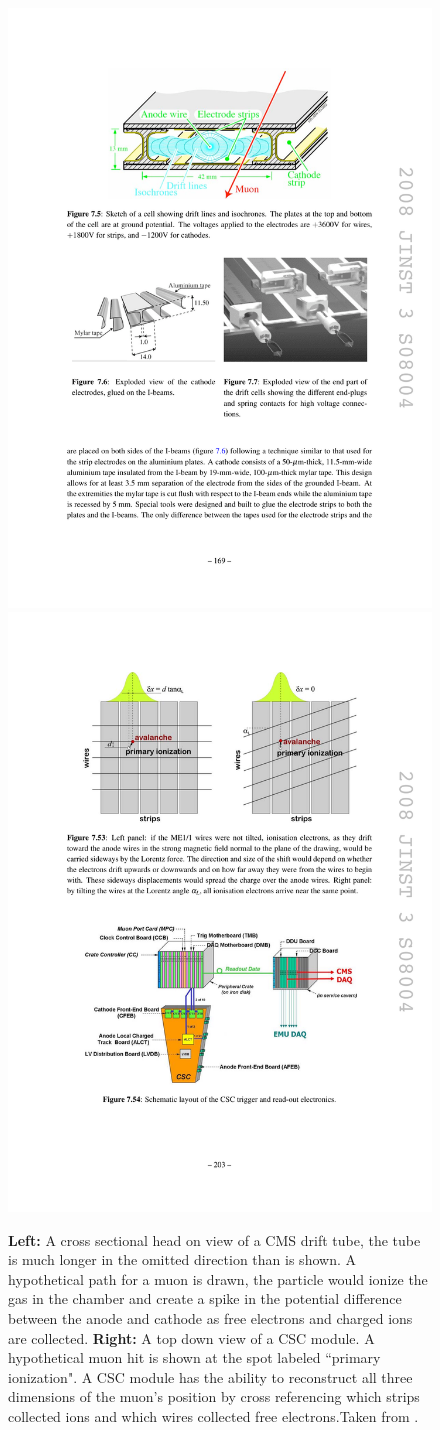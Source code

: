       \begin{figure}[h!]
        \centering
        \includegraphics[width=.45\textwidth]{figures/cms_drifttube.pdf}
        \includegraphics[width=.45\textwidth]{figures/cms_CSC.pdf}
        \caption{\textbf{Left:} A cross sectional head on view of a CMS drift tube, the tube is much longer in the omitted direction than is shown. A hypothetical path for a muon is drawn, the particle would ionize the gas in the chamber and create a spike in the potential difference between the anode and cathode as free electrons and charged ions are collected.
        \textbf{Right:} A top down view of a CSC module. A hypothetical muon hit is shown at the spot labeled ``primary ionization". A CSC module has the ability to reconstruct all three dimensions of the muon's position by cross referencing which strips collected ions and which wires collected free electrons.Taken from \cite{cms_jinst}.}
        \label{fig:muon_detectors}
      \end{figure}

